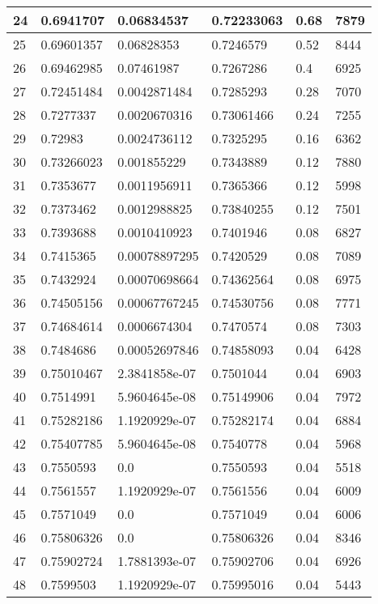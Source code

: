 \begin{longtable}{|l|l|l|l|l|l|}
24 & 0.6941707 & 0.06834537 & 0.72233063 & 0.68 & 7879 \\ \hline 
25 & 0.69601357 & 0.06828353 & 0.7246579 & 0.52 & 8444 \\ \hline 
26 & 0.69462985 & 0.07461987 & 0.7267286 & 0.4 & 6925 \\ \hline 
27 & 0.72451484 & 0.0042871484 & 0.7285293 & 0.28 & 7070 \\ \hline 
28 & 0.7277337 & 0.0020670316 & 0.73061466 & 0.24 & 7255 \\ \hline 
29 & 0.72983 & 0.0024736112 & 0.7325295 & 0.16 & 6362 \\ \hline 
30 & 0.73266023 & 0.001855229 & 0.7343889 & 0.12 & 7880 \\ \hline 
31 & 0.7353677 & 0.0011956911 & 0.7365366 & 0.12 & 5998 \\ \hline 
32 & 0.7373462 & 0.0012988825 & 0.73840255 & 0.12 & 7501 \\ \hline 
33 & 0.7393688 & 0.0010410923 & 0.7401946 & 0.08 & 6827 \\ \hline 
34 & 0.7415365 & 0.00078897295 & 0.7420529 & 0.08 & 7089 \\ \hline 
35 & 0.7432924 & 0.00070698664 & 0.74362564 & 0.08 & 6975 \\ \hline 
36 & 0.74505156 & 0.00067767245 & 0.74530756 & 0.08 & 7771 \\ \hline 
37 & 0.74684614 & 0.0006674304 & 0.7470574 & 0.08 & 7303 \\ \hline 
38 & 0.7484686 & 0.00052697846 & 0.74858093 & 0.04 & 6428 \\ \hline 
39 & 0.75010467 & 2.3841858e-07 & 0.7501044 & 0.04 & 6903 \\ \hline 
40 & 0.7514991 & 5.9604645e-08 & 0.75149906 & 0.04 & 7972 \\ \hline 
41 & 0.75282186 & 1.1920929e-07 & 0.75282174 & 0.04 & 6884 \\ \hline 
42 & 0.75407785 & 5.9604645e-08 & 0.7540778 & 0.04 & 5968 \\ \hline 
43 & 0.7550593 & 0.0 & 0.7550593 & 0.04 & 5518 \\ \hline 
44 & 0.7561557 & 1.1920929e-07 & 0.7561556 & 0.04 & 6009 \\ \hline 
45 & 0.7571049 & 0.0 & 0.7571049 & 0.04 & 6006 \\ \hline 
46 & 0.75806326 & 0.0 & 0.75806326 & 0.04 & 8346 \\ \hline 
47 & 0.75902724 & 1.7881393e-07 & 0.75902706 & 0.04 & 6926 \\ \hline 
48 & 0.7599503 & 1.1920929e-07 & 0.75995016 & 0.04 & 5443 \\ \hline 

\end{longtable}
